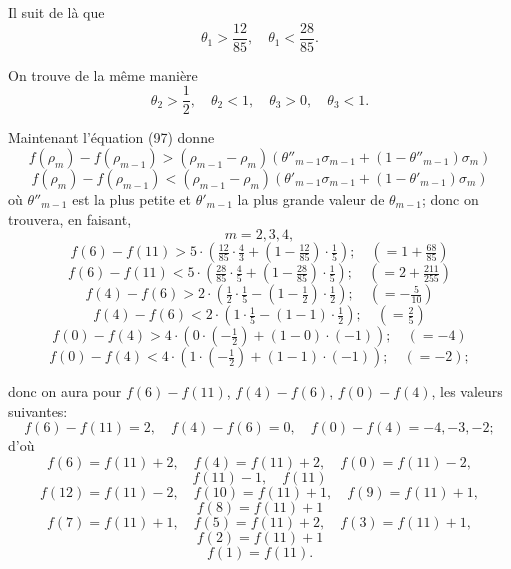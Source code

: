 \documentclass{article}
\begin{document}
Il suit de là que
\[ \theta_1 > \frac{12}{85}, \quad \theta_1 < \frac{28}{85}. \]

On trouve de la même manière
\[ \theta_2 > \frac{1}{2}, \quad \theta_2 < 1, \quad \theta_3 > 0, \quad \theta_3 < 1. \]

Maintenant l'équation (97) donne
\[ f(\rho_m) - f(\rho_{m-1}) > (\rho_{m-1}-\rho_m)\left(\theta''_{m-1}\sigma_{m-1}+(1-\theta''_{m-1})\sigma_m\right) \]
\[ f(\rho_m) - f(\rho_{m-1}) < (\rho_{m-1}-\rho_m)\left(\theta'_{m-1}\sigma_{m-1}+(1-\theta'_{m-1})\sigma_m\right) \]
où $\theta''_{m-1}$ est la plus petite et $\theta'_{m-1}$ la plus grande valeur de $\theta_{m-1}$; donc on trouvera, en faisant,
\[ m = 2, 3, 4, \]
\[ f(6) - f(11) > 5 \cdot \left(\tfrac{12}{85} \cdot \tfrac{4}{3} + \left(1-\tfrac{12}{85}\right) \cdot \tfrac{1}{5}\right); \quad \left(= 1 + \tfrac{68}{85}\right) \]
\[ f(6) - f(11) < 5 \cdot \left(\tfrac{28}{85} \cdot \tfrac{4}{5} + \left(1-\tfrac{28}{85}\right) \cdot \tfrac{1}{5}\right); \quad \left(= 2 + \tfrac{211}{255}\right) \]
\[ f(4) - f(6) > 2 \cdot \left(\tfrac{1}{2} \cdot \tfrac{1}{5} - \left(1-\tfrac{1}{2}\right) \cdot \tfrac{1}{2}\right); \quad \left(= -\tfrac{5}{10}\right) \]
\[ f(4) - f(6) < 2 \cdot \left(1 \cdot \tfrac{1}{5} - (1-1) \cdot \tfrac{1}{2}\right); \quad \left(= \tfrac{2}{5}\right) \]
\[ f(0) - f(4) > 4 \cdot \left(0 \cdot \left(-\tfrac{1}{2}\right) + (1-0) \cdot (-1)\right); \quad (= -4) \]
\[ f(0) - f(4) < 4 \cdot \left(1 \cdot \left(-\tfrac{1}{2}\right) + (1-1) \cdot (-1)\right); \quad (= -2); \]

donc on aura pour $f(6)-f(11)$, $f(4)-f(6)$, $f(0)-f(4)$, les valeurs suivantes:
\[ f(6)-f(11) = 2, \quad f(4)-f(6) = 0, \quad f(0)-f(4) = -4, -3, -2; \]
d'où
\[ f(6) = f(11)+2, \quad f(4) = f(11)+2, \quad f(0) = f(11)-2, \]
\[ f(11)-1, \quad f(11) \]
\[ f(12) = f(11)-2, \quad f(10) = f(11)+1, \quad f(9) = f(11)+1, \]
\[ f(8) = f(11)+1 \]
\[ f(7) = f(11)+1, \quad f(5) = f(11)+2, \quad f(3) = f(11)+1, \]
\[ f(2) = f(11)+1 \]
\[ f(1) = f(11). \]
\end{document}

